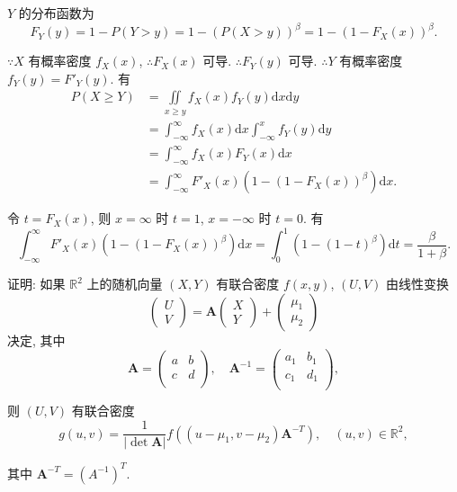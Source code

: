 \documentclass[color=black,device=normal,lang=cn]{elegantnote}
\numberwithin{equation}{section}
\theoremstyle{plain}
\numberwithin{exercise}{exsection}
\begin{document}
\begin{solution}
    $Y$ 的分布函数为
    \[F_Y(y)=1-P(Y>y)=1-(P(X>y))^\beta=1-(1-F_X(x))^\beta.\]

    $\because X$ 有概率密度 $f_X(x)$, $\therefore F_X(x)$ 可导. $\therefore F_Y(y)$ 可导. $\therefore Y$ 有概率密度 $f_Y(y)=F'_Y(y)$. 有
    \begin{align*}
        P(X\geq Y) & =\iint\limits_{x\geq y}f_X(x)f_Y(y)\mathrm{d}x\mathrm{d}y \\
        & =\int_{-\infty}^\infty f_X(x)\mathrm{d}x\int_{-\infty}^x f_Y(y)\mathrm{d}y \\
        & =\int_{-\infty}^\infty f_X(x)F_Y(x)\mathrm{d}x \\
        & =\int_{-\infty}^\infty F'_X(x)(1-(1-F_X(x))^\beta)\mathrm{d}x.
    \end{align*}

    令 $t=F_X(x)$, 则 $x=\infty$ 时 $t=1$, $x=-\infty$ 时 $t=0$. 有
    \[\int_{-\infty}^\infty F'_X(x)(1-(1-F_X(x))^\beta)\mathrm{d}x=\int_0^1(1-(1-t)^\beta)\mathrm{d}t=\dfrac{\beta}{1+\beta}.\]
\end{solution}
\begin{exercise}[有修改]\label{ex4.36}
    证明: 如果 $\mathbb{R}^2$ 上的随机向量 $(X,Y)$ 有联合密度 $f(x,y)$, $(U,V)$ 由线性变换
    \[\begin{pmatrix}
        U \\ V
    \end{pmatrix}=\boldsymbol{A}\begin{pmatrix}
        X \\ Y
    \end{pmatrix}+\begin{pmatrix}
        \mu_1 \\ \mu_2
    \end{pmatrix}\]
    决定, 其中
    \[\boldsymbol{A}=\begin{pmatrix}
        a & b \\
        c & d \\
    \end{pmatrix},\quad\boldsymbol{A}^{-1}=\begin{pmatrix}
        a_1 & b_1 \\
        c_1 & d_1 \\
    \end{pmatrix},\]

    则 $(U,V)$ 有联合密度
    \[g(u,v)=\dfrac{1}{|\det\boldsymbol{A}|}f((u-\mu_1,v-\mu_2)\boldsymbol{A}^{-T}),\quad(u,v)\in\mathbb{R}^2,\]

    其中 $\boldsymbol{A}^{-T}=(A^{-1})^T$.
\end{exercise}
\end{document}
